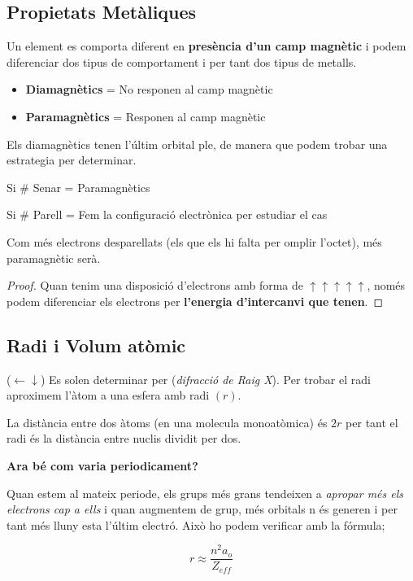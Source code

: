 \documentclass[12pt]{article}
\begin{document}
\subsection{Propietats Metàliques}

Un element es comporta diferent en \textbf{presència d'un camp magnètic} i podem diferenciar dos tipus de comportament i per tant dos tipus de metalls.

\begin{itemize}
    \item \textbf{Diamagnètics} = No responen al camp magnètic
    \item \textbf{Paramagnètics} = Responen al camp magnètic
\end{itemize}

Els diamagnètics tenen l'últim orbital ple, de manera que podem trobar una estrategia per determinar.

Si \# Senar = Paramagnètics

Si \# Parell = Fem la configuració electrònica per estudiar el cas

Com més electrons desparellats (els que els hi falta per omplir l'octet), més paramagnètic serà.
\begin{proof}
Quan tenim una disposició d'electrons amb forma de $\boxed{\uparrow}\boxed{\uparrow}\boxed{\uparrow}\boxed{\uparrow}\boxed{\uparrow}$, només podem diferenciar els electrons per \textbf{l'energia d'intercanvi que tenen}. 

\end{proof}

\subsection{Radi i Volum atòmic} 

($\leftarrow \downarrow$) Es solen determinar per (\textit{difracció de Raig X}). Per trobar el radi aproximem l'àtom a una esfera amb radi $(r)$.

La distància entre dos àtoms (en una molecula monoatòmica) és $2r$ per tant el radi és la distància entre nuclis dividit per dos.

\textbf{Ara bé com varia periodicament?}

Quan estem al mateix periode, els grups més grans tendeixen a \textit{apropar més els electrons cap a ells} i quan augmentem de grup, més orbitals n és generen i per tant més lluny esta l'últim electró. Això ho podem verificar amb la fórmula;

\[r \approx \frac{n^2a_o}{Z_{eff}}\]
\end{document}
